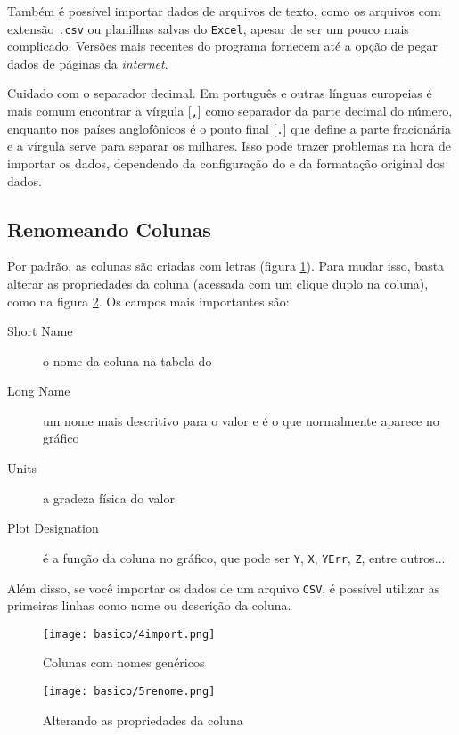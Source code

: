     Também é possível importar dados de arquivos de texto, como os arquivos com extensão \texttt{.csv} ou planilhas salvas do \texttt{Excel}, apesar de ser um pouco mais complicado. Versões mais recentes do programa fornecem até a opção de pegar dados de páginas da \textit{internet}.

    \begin{lembrete}
        Cuidado com o separador decimal. Em português e outras línguas europeias é mais comum encontrar a vírgula [\texttt{,}] como separador da parte decimal do número, enquanto nos países anglofônicos é o ponto final [\texttt{.}] que define a parte fracionária e a vírgula serve para separar os milhares. Isso pode trazer problemas na hora de importar os dados, dependendo da configuração do \software e da formatação original dos dados.
    \end{lembrete}


\subsection{Renomeando Colunas} \label{sec:basico:renome}

    Por padrão, as colunas são criadas com letras (figura \ref{fig:basico:importado}). Para mudar isso, basta alterar as propriedades da coluna (acessada com um clique duplo na coluna), como na figura \ref{fig:basico:renomear}. Os campos mais importantes são:

    \begin{description}
        \item[Short Name] o nome da coluna na tabela do \software
        \item[Long Name] um nome mais descritivo para o valor e é o que normalmente aparece no gráfico
        \item[Units] a gradeza física do valor
        \item[Plot Designation] é a função da coluna no gráfico, que pode ser \texttt{Y}, \texttt{X}, \texttt{YErr}, \texttt{Z}, entre outros...
    \end{description}

    Além disso, se você importar os dados de um arquivo \texttt{CSV}, é possível utilizar as primeiras linhas como nome ou descrição da coluna.

    \begin{figure}[htbp]
        \centering
        \texttt{[image: basico/4import.png]}

        \caption{Colunas com nomes genéricos}
        \label{fig:basico:importado}
    \end{figure}

    \begin{figure}[htbp]
        \centering
        \texttt{[image: basico/5renome.png]}

        \caption{Alterando as propriedades da coluna}
        \label{fig:basico:renomear}
    \end{figure}
